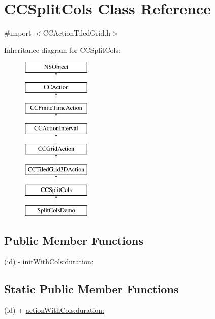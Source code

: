 \hypertarget{interface_c_c_split_cols}{\section{C\-C\-Split\-Cols Class Reference}
\label{interface_c_c_split_cols}
}


{\ttfamily \#import $<$C\-C\-Action\-Tiled\-Grid.\-h$>$}

Inheritance diagram for C\-C\-Split\-Cols\-:\begin{figure}[H]
\begin{center}
\leavevmode
\includegraphics[height=8.000000cm]{interface_c_c_split_cols}
\end{center}
\end{figure}
\subsection*{Public Member Functions}
\begin{DoxyCompactItemize}
\item 
(id) -\/ \hyperlink{interface_c_c_split_cols_a2a4ae12ea0fe84ecb7cc33988b286d96}{init\-With\-Cols\-:duration\-:}
\end{DoxyCompactItemize}
\subsection*{Static Public Member Functions}
\begin{DoxyCompactItemize}
\item 
(id) + \hyperlink{interface_c_c_split_cols_ade79e7d5e011dfbf5e88b51a4481c42d}{action\-With\-Cols\-:duration\-:}
\end{DoxyCompactItemize}
